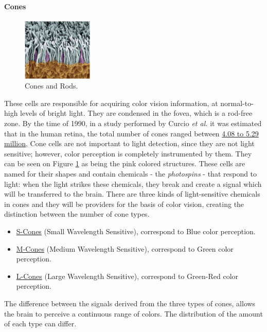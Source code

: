 \paragraph{Cones}
%
\begin{figure}
	\centering
  \vspace{-\baselineskip}
	\includegraphics[width=0.3\textwidth]{images/background/Eye_ConesRods.png}
  \caption[Cones and Rods]{Cones and Rods.\protect\footnotemark{}}
  \label{fig:conesrods}
\end{figure}
%
These cells are responsible for acquiring color vision information, at normal-to-high levels of bright
light. They are condensed in the fovea, which is a rod-free zone. By the time of 1990, in a study performed
by Curcio \emph{et al.} \cite{Curcio1990} it was estimated that in the human retina, the total number of cones ranged
between \ul{4.08 to 5.29 million}, Cone cells are not important to light detection, since they are not light
sensitive; however, color perception is completely instrumented by them. They can be seen on Figure \ref{fig:conesrods} as
being the pink colored structures.
These cells are named for their shapes and contain chemicals - the \emph{photospins} - that respond to light: when the
light strikes these chemicals, they break and create a signal which will be transferred to the brain.
There are three kinds of light-sensitive chemicals in cones and they will be providers for the basis
of color vision, creating the distinction between the number of cone types.
%
\begin{itemize}
	\setlength\itemsep{0.01em}
	\item \ul{S-Cones} (Small Wavelength Sensitive), correspond to Blue color perception.
	\item \ul{M-Cones} (Medium Wavelength Sensitive), correspond to Green color perception.
	\item \ul{L-Cones} (Large Wavelength Sensitive), correspond to Green-Red color perception.
\end{itemize} \par
%
The difference between the signals derived from the three types of cones, allows the brain to perceive a
continuous range of colors. The distribution of the amount of each type can differ.
%
